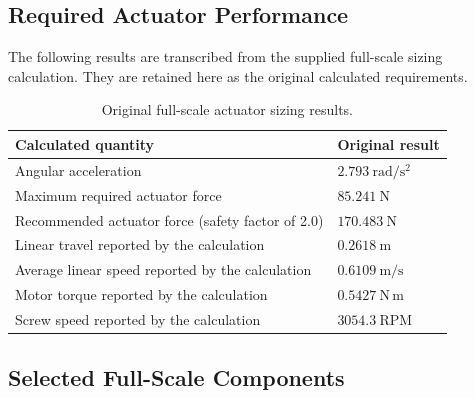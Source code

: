 \documentclass[11pt]{article}
\begin{document}
\newpage

\subsection{Required Actuator Performance}

The following results are transcribed from the supplied full-scale sizing
calculation. They are retained here as the original calculated requirements.

\begin{table}[h!]
\centering
\begin{tabularx}{\textwidth}{@{}Y l@{}}
\toprule
\textbf{Calculated quantity} & \textbf{Original result} \\
\midrule
Angular acceleration & $2.793\ \mathrm{rad/s^2}$ \\
Maximum required actuator force & $85.241\ \mathrm{N}$ \\
Recommended actuator force (safety factor of 2.0) & $170.483\ \mathrm{N}$ \\
Linear travel reported by the calculation & $0.2618\ \mathrm{m}$ \\
Average linear speed reported by the calculation & $0.6109\ \mathrm{m/s}$ \\
Motor torque reported by the calculation & $0.5427\ \mathrm{N\,m}$ \\
Screw speed reported by the calculation & $3054.3\ \mathrm{RPM}$ \\
\bottomrule
\end{tabularx}
\caption{Original full-scale actuator sizing results.}
\end{table}

\subsection{Selected Full-Scale Components}
\end{document}
